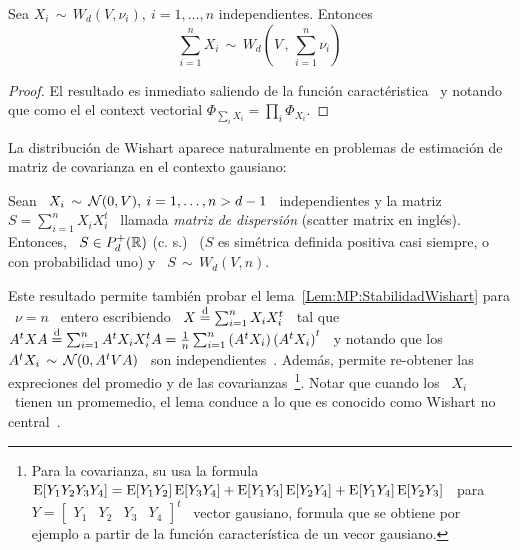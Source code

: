 \begin{lema}
\label{Lem:MP:StabilidadWishartSuma}
%
  Sea $X_i \,  \sim \, W_d(V,\nu_i), \: i = 1,\ldots,n$ independientes. Entonces
  \[
  \sum_{i=1}^n X_i \, \sim \, W_d\left( V \, , \, \sum_{i=1}^n \nu_i \right)
  \]
\end{lema}
%
\begin{proof}
  El     resultado     es     inmediato     saliendo     de     la     funci\'on
  caract\'eristica~ y notando que como el
  el context vectorial $\Phi_{\sum_i X_i} = \prod_i \Phi_{X_i}$.
\end{proof}

La distribuci\'on  de Wishart aparece naturalmente en  problemas de estimaci\'on
de matriz de covarianza en el contexto gausiano:
%
\begin{lema}
  Sean \ $X_i \, \sim \, \mathcal{N}(0,V), \: i = 1, \ldots , n > d-1$ \ independientes y
  la  matriz  \  $S  =  \sum_{i=1}^n   X_i  X_i^t$  \  llamada  {\em  matriz  de
    dispersi\'on} (scatter matrix en ingl\'es). Entonces, \ $S \in P_d^+(\mathbb{R})$
  (c.   s.)   \  ($S$ es  sim\'etrica  definida  positiva  casi siempre,  o  con
  probabilidad uno) y \ $S \,\sim \, W_d(V,n)$.
\end{lema}
%
Este resultado  permite tambi\'en probar  el lema~\ref{Lem:MP:StabilidadWishart}
para \ $\nu = n$ \ entero  escribiendo \ $X \stackrel{\mathrm{d}}{=} \sum_{i=1}^n X_i X_i^t$ \ tal
que \ $A^t X A \stackrel{\mathrm{d}}{=} \sum_{i=1}^n A^t X_i X_i^t A = \frac1n \sum_{i=1}^n \left(
  A^t X_i \right)  \left( A^t X_i \right)^t$ \  y notando que los \  $A^t X_i \,
\sim \,  \mathcal{N}(0, A^t V  A)$ \ son independientes~\cite{Seb04}.   Adem\'as, permite
re-obtener las  expreciones del promedio y de  las covarianzas~\footnote{Para la
  covarianza, su usa la formula \ $\operatorname{E}[Y_1 Y_2 Y_3 Y_4] = \operatorname{E}[Y_1 Y_2]\operatorname{E}[Y_3
  Y_4]  + \operatorname{E}[Y_1 Y_3]\operatorname{E}[Y_2  Y_4] +  \operatorname{E}[Y_1 Y_4]\operatorname{E}[Y_2  Y_3]$ \  para $Y
  = \begin{bmatrix}  Y_1 & Y_2 &  Y_3 & Y_4 \end{bmatrix}^t$  \ vector gausiano,
  formula que se  obtiene por ejemplo a partir  de la funci\'on caracter\'istica
  de un vecor  gausiano.}. Notar que cuando los \ $X_i$  \ tienen un promemedio,
el  lema conduce  a  lo que  es  conocido como  Wishart no  central~\cite{And03,
  Seb04}.


